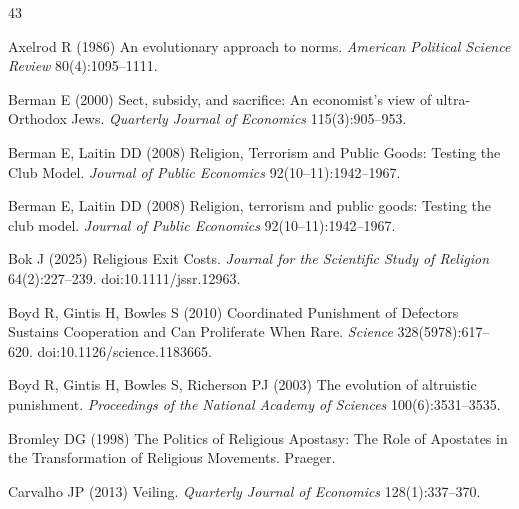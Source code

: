 \documentclass[12pt]{article}
\begin{document}
%
\begin{thebibliography}{43}

Axelrod R (1986) An evolutionary approach to norms. \textit{American Political Science Review} 80(4):1095--1111.

Berman E (2000) Sect, subsidy, and sacrifice: An economist's view of ultra-Orthodox Jews. \textit{Quarterly Journal of Economics} 115(3):905--953.

Berman E, Laitin DD (2008) Religion, Terrorism and Public Goods: Testing the Club Model. \textit{Journal of Public Economics} 92(10--11):1942--1967.

Berman E, Laitin DD (2008) Religion, terrorism and public goods: Testing the club model. \textit{Journal of Public Economics} 92(10--11):1942--1967.

Bok J (2025) Religious Exit Costs. \textit{Journal for the Scientific Study of Religion} 64(2):227--239. doi:10.1111/jssr.12963.

Boyd R, Gintis H, Bowles S (2010) Coordinated Punishment of Defectors Sustains Cooperation and Can Proliferate When Rare. \textit{Science} 328(5978):617--620. doi:10.1126/science.1183665.

Boyd R, Gintis H, Bowles S, Richerson PJ (2003) The evolution of altruistic punishment. \textit{Proceedings of the National Academy of Sciences} 100(6):3531--3535.

Bromley DG (1998) The Politics of Religious Apostasy: The Role of Apostates in the Transformation of Religious Movements. Praeger.

Carvalho JP (2013) Veiling. \textit{Quarterly Journal of Economics} 128(1):337--370.


\end{thebibliography}
\end{document}
